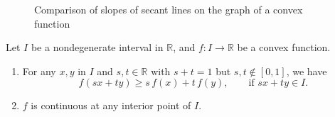 \begin{figure}
  \centering
  \caption{Comparison of slopes of secant lines on the graph of a convex function}
  \label{fig:convex-secant}
\end{figure}
\begin{thm}
  Let $I$ be a nondegenerate interval in $\mathbb{R}$, and $f : I \to \mathbb{R}$ be a convex function.
  \begin{enumerate}[$(a)$]
    \item For any $x,y$ in $I$ and $s, t \in \mathbb{R}$ with $s + t = 1$ but $s, t \notin [0,1]$, we have
      \[
	f(sx + ty) \geqslant s \, f(x) + t \, f(y), \qquad
	\text{if } sx + ty \in I.
      \]

    \item $f$ is continuous at any interior point of $I$.
  \end{enumerate}
\end{thm}

